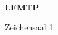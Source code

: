 \documentclass[a4paper]{article}
\begin{document}
\printGenericVSLHeader
\begin{center}
\begin{vsltext}{3cm}{4cm}

   \vspace{0.5cm} 

    \textbf{LFMTP} 

    \vspace{1.5cm}

    Zeichensaal 1

\end{vsltext}

\end{center}
\end{document}
